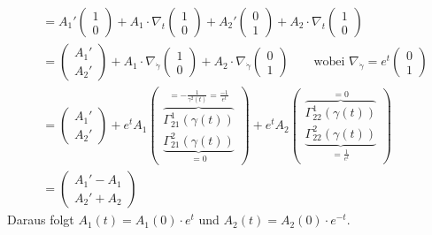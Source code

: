 \begin{bsp}
\begin{enumerate}[label=(\arabic*),leftmargin=*]
\begin{align*}
		&= A_1' \begin{pmatrix} 1 \\ 0 \end{pmatrix} + A_1 \cdot \nabla_t \begin{pmatrix} 1 \\ 0 \end{pmatrix} + A_2' \begin{pmatrix} 0 \\ 1 \end{pmatrix} + A_2 \cdot \nabla_t \begin{pmatrix} 1 \\ 0 \end{pmatrix} \\
		&= \begin{pmatrix} A_1' \\ A_2' \end{pmatrix} + A_1 \cdot \nabla_{\dot\gamma} \begin{pmatrix} 1 \\ 0 \end{pmatrix} + A_2 \cdot \nabla_{\dot\gamma} \begin{pmatrix} 0 \\ 1 \end{pmatrix} \qquad \text{wobei } \nabla_{\dot\gamma}= e^t \begin{pmatrix}0\\1\end{pmatrix} \\
		&= \begin{pmatrix} A_1' \\ A_2' \end{pmatrix} + e^tA_1 \begin{pmatrix} \overbrace{\Gamma_{21}^1(\gamma(t))}^{= - \frac{1}{\gamma^2(t)} = \frac{-1}{e^t}} \\ \underbrace{\Gamma_{21}^2(\gamma(t))}_{=0} \end{pmatrix} + e^t A_2 \begin{pmatrix} \overbrace{\Gamma_{22}^1(\gamma(t))}^{=0} \\ \underbrace{\Gamma_{22}^2(\gamma(t))}_{= \frac{1}{e^t}} \end{pmatrix} \\
		&= \begin{pmatrix} A_1' - A_1 \\ A_2' + A_2 \end{pmatrix}
	\end{align*}
	Daraus folgt $A_1(t) = A_1(0) \cdot e^t$ und $A_2(t) = A_2(0) \cdot e^{-t}$.
\end{enumerate}\end{bsp}